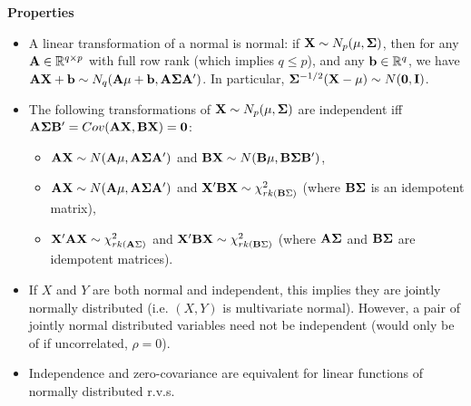 \documentclass[DIV=14,titlepage=false]{scrreprt}
\begin{document}
\textbf{Properties}
\begin{itemize}
  \item A linear transformation of a normal is normal: if $ \mathbf{X} \sim N_p (\mathbf{\mu}, \mathbf{\Sigma}) $, then for any $ \mathbf{A} \in \mathbb{R}^{q \times p} $ with full row rank (which implies $ q \leq p $), and any $ \mathbf{b} \in \mathbb{R}^q $, we have $ \mathbf{A} \mathbf{X} + \mathbf{b} \sim N_q (\mathbf{A} \mathbf{\mu} + \mathbf{b} , \mathbf{A} \mathbf{\Sigma} \mathbf{A}' ) $. In particular, $ \mathbf{\Sigma}^{-1/2} (\mathbf{X} - \mathbf{\mu}) \sim N (\mathbf{0}, \mathbf{I})$.
  \item The following transformations of $ \mathbf{X} \sim N_p (\mathbf{\mu}, \mathbf{\Sigma}) $ are independent iff $ \mathbf{A} \mathbf{\Sigma} \mathbf{B}' = Cov (\mathbf{A} \mathbf{X} , \mathbf{B} \mathbf{X}) = \mathbf{0} $:
  \begin{itemize}
  \item $ \mathbf{A} \mathbf{X} \sim N (\mathbf{A} \mathbf{\mu} , \mathbf{A} \mathbf{\Sigma} \mathbf{A}') $ and $ \mathbf{B} \mathbf{X} \sim N (\mathbf{B} \mathbf{\mu} , \mathbf{B} \mathbf{\Sigma} \mathbf{B}') $,
  \item $ \mathbf{A} \mathbf{X} \sim N (\mathbf{A} \mathbf{\mu} , \mathbf{A} \mathbf{\Sigma} \mathbf{A}') $ and $ \mathbf{X}' \mathbf{B} \mathbf{X} \sim \chi^2_{rk (\mathbf{B} \Sigma)} $ (where $ \mathbf{B} \mathbf{\Sigma} $ is an idempotent matrix),
  \item $ \mathbf{X}' \mathbf{A} \mathbf{X} \sim \chi^2_{rk (\mathbf{A} \Sigma)} $ and $ \mathbf{X}' \mathbf{B} \mathbf{X} \sim \chi^2_{rk (\mathbf{B} \Sigma)} $ (where $ \mathbf{A} \mathbf{\Sigma} $ and $ \mathbf{B} \mathbf{\Sigma} $ are idempotent matrices).
  \end{itemize}
  \item If $X$ and $Y$ are both normal and independent, this implies they are jointly normally distributed (i.e. $(X,Y)$ is multivariate normal). However, a pair of jointly normal distributed variables need not be independent (would only be of if uncorrelated, $\rho=0$).
  \item Independence and zero-covariance are equivalent for linear functions of normally distributed r.v.s.
\end{itemize}
\end{document}
